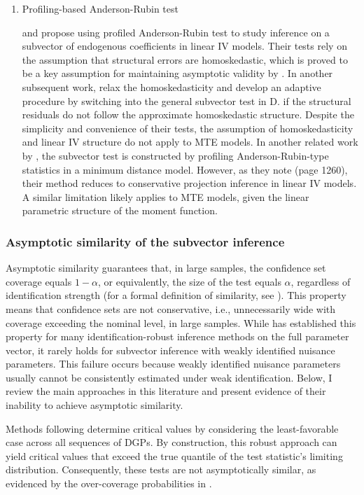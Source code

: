 \documentclass[11pt]{article}
\theoremstyle{definition}
\newcommand{\0}{\ensuremath{\mathbf{0}}}
\begin{document}
\begin{bibunit}
\begin{enumerate}
\item Profiling-based Anderson-Rubin test \par
\cite{gkmc:2012} and \cite{gkm:2019} propose using profiled Anderson-Rubin test to study inference on a subvector of endogenous coefficients in linear IV models. Their tests rely on the assumption that structural errors are homoskedastic, which is proved to be a key assumption for maintaining asymptotic validity by \cite{lee:2015}. In another subsequent work, \cite{gkm:2021} relax the homoskedasticity and develop an adaptive procedure by switching into the general subvector test in D. \cite{andrews.d:2017} if the structural residuals do not follow the approximate homoskedastic structure. Despite the simplicity and convenience of their tests, the assumption of homoskedasticity and linear IV structure do not apply to MTE models. In another related work by \cite{andrews/mikusheva:2016a}, the subvector test is constructed by profiling Anderson-Rubin-type statistics in a minimum distance model. However, as they note (page 1260), their method reduces to conservative projection inference in linear IV models. A similar limitation likely applies to MTE models, given the linear parametric structure of the moment function. 
\end{enumerate}

\subsubsection*{Asymptotic similarity of the subvector inference}

Asymptotic similarity guarantees that, in large samples, the confidence set coverage equals $1-\alpha$, or equivalently, the size of the test equals $\alpha$, regardless of identification strength (for a formal definition of similarity, see \cite{andrews/cheng/guggenberger:2020}). This property means that confidence sets are not conservative, i.e., unnecessarily wide with coverage exceeding the nominal level, in large samples. While \cite{andrews/guggenberger:2017} has established this property for many identification-robust inference methods on the full parameter vector, it rarely holds for subvector inference with weakly identified nuisance parameters. This failure occurs because weakly identified nuisance parameters usually cannot be consistently estimated under weak identification. Below, I review the main approaches in this literature and present evidence of their inability to achieve asymptotic similarity.

Methods following \cite{andrews/cheng:2012,andrews/cheng:2013,andrews/cheng:2014} determine critical values by considering the least-favorable case across all sequences of DGPs. By construction, this robust approach can yield critical values that exceed the true quantile of the test statistic's limiting distribution. Consequently, these tests are not asymptotically similar, as evidenced by the over-coverage probabilities in \citet[Figure 7]{andrews/cheng:2012}.


\end{bibunit}
\end{document}
